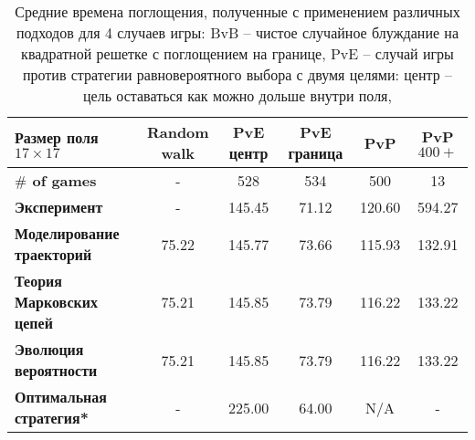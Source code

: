 \begin{table}[]
    \begin{tabular}{|l|c|c|c|c|c|}%
        \hline
        \toprule
        Размер поля $17 \times 17$ & Random walk & \textbf{PvE центр} & \textbf{PvE граница} & \textbf{PvP} & \textbf{PvP $400+$} \\ \hline
        \textbf{$\#$ of games} & -     & 528    & 534   & 500    & 13     \\ \hline
        \midrule
        \textbf{Эксперимент}  & -     & 145.45 & 71.12 & 120.60 & 594.27 \\ \hline
        \textbf{Моделирование траекторий}  & 75.22 & 145.77 & 73.66 & 115.93 & 132.91 \\
        \textbf{Теория Марковских цепей}  & 75.21 & 145.85 & 73.79 & 116.22 & 133.22 \\
        \textbf{Эволюция вероятности}   & 75.21 & 145.85 & 73.79 & 116.22 & 133.22 \\ \hline
        \textbf{Оптимальная стратегия*}     & -     & 225.00 & 64.00 &    N/A & -      \\ \hline
        \bottomrule
    \end{tabular}
    \caption{
        Средние времена поглощения, полученные с применением различных подходов для 4 случаев игры: 
        BvB -- чистое случайное блуждание на квадратной решетке с поглощением на границе,
        PvE -- случай игры против стратегии равновероятного выбора с двумя целями: центр -- цель оставаться как можно дольше внутри поля, 
}
\end{table}
